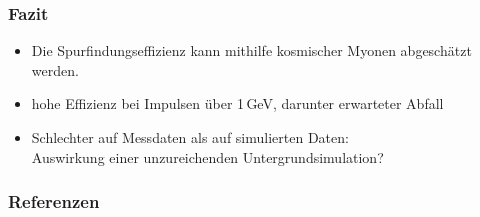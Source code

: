 \documentclass[18pt]{beamer}
\begin{document}

\begin{frame}
  \frametitle{Fazit}
  \begin{itemize}
  \item Die Spurfindungseffizienz kann mithilfe kosmischer Myonen abgeschätzt werden.
  \item hohe Effizienz bei Impulsen über 1\,GeV, darunter erwarteter Abfall\\
  \item Schlechter auf Messdaten als auf simulierten Daten:\\
    Auswirkung einer unzureichenden Untergrundsimulation?  
  \end{itemize}
\end{frame}

\backupbegin
\begin{frame}\label{lastbeforebackup}
  \frametitle{Referenzen}
  \printbibliography
\end{frame}
\end{document}
